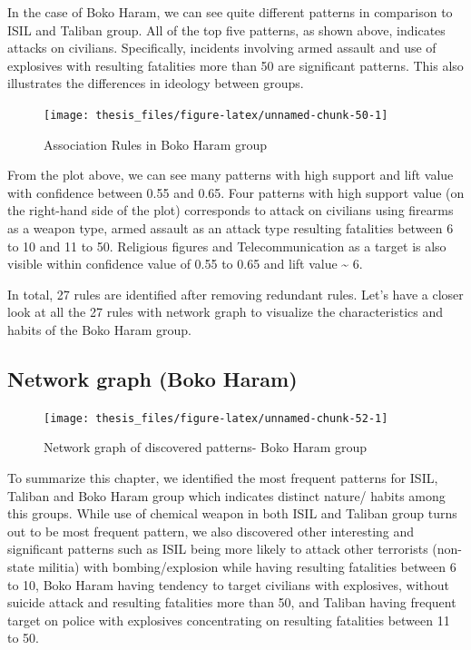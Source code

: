\documentclass[11pt,oneside,a4paper]{reedthesis}
\begin{document}
In the case of Boko Haram, we can see quite different patterns in
comparison to ISIL and Taliban group. All of the top five patterns, as
shown above, indicates attacks on civilians. Specifically, incidents
involving armed assault and use of explosives with resulting fatalities
more than 50 are significant patterns. This also illustrates the
differences in ideology between groups.
\begin{figure}
\texttt{[image: thesis\_files/figure-latex/unnamed-chunk-50-1]} \caption{Association Rules in Boko Haram group}\label{fig:unnamed-chunk-50}
\end{figure}
From the plot above, we can see many patterns with high support and lift
value with confidence between 0.55 and 0.65. Four patterns with high
support value (on the right-hand side of the plot) corresponds to attack
on civilians using firearms as a weapon type, armed assault as an attack
type resulting fatalities between 6 to 10 and 11 to 50. Religious
figures and Telecommunication as a target is also visible within
confidence value of 0.55 to 0.65 and lift value \textasciitilde{} 6.

In total, 27 rules are identified after removing redundant rules. Let's
have a closer look at all the 27 rules with network graph to visualize
the characteristics and habits of the Boko Haram group.

\subsection{Network graph (Boko Haram)}\label{network-graph-boko-haram}
\begin{figure}
\texttt{[image: thesis\_files/figure-latex/unnamed-chunk-52-1]} \caption{Network graph of discovered patterns- Boko Haram group}\label{fig:unnamed-chunk-52}
\end{figure}
To summarize this chapter, we identified the most frequent patterns for
ISIL, Taliban and Boko Haram group which indicates distinct nature/
habits among this groups. While use of chemical weapon in both ISIL and
Taliban group turns out to be most frequent pattern, we also discovered
other interesting and significant patterns such as ISIL being more
likely to attack other terrorists (non-state militia) with
bombing/explosion while having resulting fatalities between 6 to 10,
Boko Haram having tendency to target civilians with explosives, without
suicide attack and resulting fatalities more than 50, and Taliban having
frequent target on police with explosives concentrating on resulting
fatalities between 11 to 50.
\end{document}
